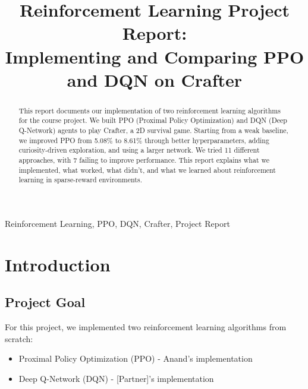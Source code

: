 \documentclass[conference]{IEEEtran}
\begin{document}
\title{Reinforcement Learning Project Report:\\Implementing and Comparing PPO and DQN on Crafter}

\author{
    \and
}

\maketitle

\begin{abstract}
This report documents our implementation of two reinforcement learning algorithms for the course project. We built PPO (Proximal Policy Optimization) and DQN (Deep Q-Network) agents to play Crafter, a 2D survival game. Starting from a weak baseline, we improved PPO from 5.08\% to 8.61\% through better hyperparameters, adding curiosity-driven exploration, and using a larger network. We tried 11 different approaches, with 7 failing to improve performance. This report explains what we implemented, what worked, what didn't, and what we learned about reinforcement learning in sparse-reward environments.
\end{abstract}

\begin{IEEEkeywords}
Reinforcement Learning, PPO, DQN, Crafter, Project Report
\end{IEEEkeywords}

\section{Introduction}

\subsection{Project Goal}

For this project, we implemented two reinforcement learning algorithms from scratch:
\begin{itemize}
    \item Proximal Policy Optimization (PPO) - Anand's implementation
    \item Deep Q-Network (DQN) - [Partner]'s implementation
\end{itemize}
\end{document}

